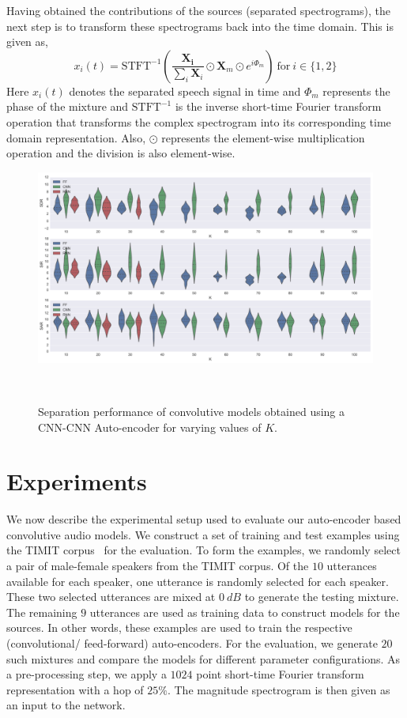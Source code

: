 \documentclass{article}
\begin{document}
Having obtained the contributions of the sources (separated spectrograms), the next step is to transform these spectrograms back into the time domain. This is given as,
\begin{equation}
    x_{i}(t) = \text{STFT}^{-1}\left(\frac{\mathbf{X_{i}}}{\sum_{i}\mathbf{X}_{i}}\odot \mathbf{X}_{m} \odot e^{i\Phi_{m}}\right)~\text{for}~i\in\{1, 2\}
\end{equation}
Here $x_{i}(t)$ denotes the separated speech signal in time and $\Phi_{m}$ represents the phase of the mixture and $\text{STFT}^{-1}$ is the inverse short-time Fourier transform operation that transforms the complex spectrogram into its corresponding time domain representation. Also, $\odot$ represents the element-wise multiplication operation and the division is also element-wise.

\begin{figure}[ht!]
\centering
  \includegraphics[clip, trim = 0cm 0cm 0cm 0cm, width=\linewidth]{Figs/FullPerformance.png}
  \caption{Separation performance of convolutive models obtained using a CNN-CNN Auto-encoder for varying values of $K$. }~\label{fig:cnnseparation_performance}
\end{figure}

\section{Experiments}
\label{sec:experiments}
We now describe the experimental setup used to evaluate our auto-encoder based convolutive audio models. We construct a set of training and test examples using the TIMIT corpus~\cite{timit} for the evaluation. To form the examples, we randomly select a pair of male-female speakers from the TIMIT corpus. Of the $10$ utterances available for each speaker, one utterance is randomly selected for each speaker. These two selected utterances are mixed at $0~dB$ to generate the testing mixture. The remaining $9$ utterances are used as training data to construct models for the sources. In other words, these examples are used to train the respective (convolutional/ feed-forward) auto-encoders. For the evaluation, we generate $20$ such mixtures and compare the models for different parameter configurations. As a pre-processing step, we apply a $1024$ point short-time Fourier transform representation with a hop of $25\%$. The magnitude spectrogram is then given as an input to the network. 
\end{document}
